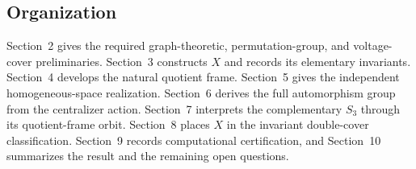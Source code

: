 \subsection{Organization}

Section~2 gives the required graph-theoretic, permutation-group, and
voltage-cover preliminaries. Section~3 constructs \(X\) and records its
elementary invariants. Section~4 develops the natural quotient frame.
Section~5 gives the independent homogeneous-space realization. Section~6
derives the full automorphism group from the centralizer action.
Section~7 interprets the complementary \(S_3\) through its quotient-frame
orbit. Section~8 places \(X\) in the invariant double-cover
classification. Section~9 records computational certification, and
Section~10 summarizes the result and the remaining open questions.
